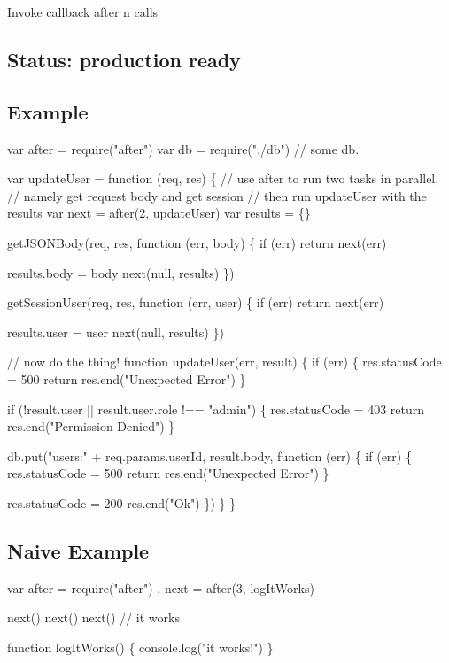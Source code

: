 Invoke callback after n calls

\subsection*{Status\+: production ready}

\subsection*{Example}


\begin{DoxyCode}
var after = require("after")
var db = require("./db") // some db.

var updateUser = function (req, res) \{
  // use after to run two tasks in parallel,
  // namely get request body and get session
  // then run updateUser with the results
  var next = after(2, updateUser)
  var results = \{\}

  getJSONBody(req, res, function (err, body) \{
    if (err) return next(err)

    results.body = body
    next(null, results)
  \})

  getSessionUser(req, res, function (err, user) \{
    if (err) return next(err)

    results.user = user
    next(null, results)
  \})

  // now do the thing!
  function updateUser(err, result) \{
    if (err) \{
      res.statusCode = 500
      return res.end("Unexpected Error")
    \}

    if (!result.user || result.user.role !== "admin") \{
      res.statusCode = 403
      return res.end("Permission Denied")
    \}

    db.put("users:" + req.params.userId, result.body, function (err) \{
      if (err) \{
        res.statusCode = 500
        return res.end("Unexpected Error")
      \}

      res.statusCode = 200
      res.end("Ok")  
    \})   
  \}
\}
\end{DoxyCode}


\subsection*{Naive Example}


\begin{DoxyCode}
var after = require("after")
    , next = after(3, logItWorks)

next()
next()
next() // it works

function logItWorks() \{
    console.log("it works!")
\}
\end{DoxyCode}


